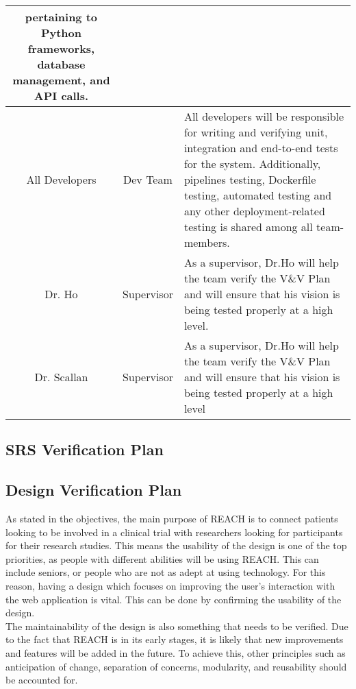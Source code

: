 \documentclass[12pt, titlepage]{article}
\begin{document}
\begin{table}[H]
\begin{tabular}{|c|c|p{10cm}|}
        pertaining to Python frameworks, database management, and API calls. \\
        \hline
        All Developers & Dev Team & All developers will be responsible for writing and verifying unit, integration and 
        end-to-end tests for the system. Additionally, pipelines testing, Dockerfile testing, automated testing and any 
        other deployment-related testing is shared among all team-members.\\
        \hline
        Dr. Ho & Supervisor & As a supervisor, Dr.Ho will help the team verify the V\&V Plan and will ensure that 
        his vision is being tested properly at a high level.\\
        \hline
        Dr. Scallan & Supervisor & As a supervisor, Dr.Ho will help the team verify the V\&V Plan and will 
        ensure that his vision is being tested properly at a high level \\       
        \hline
    \end{tabular}
\end{table}

\subsection{SRS Verification Plan}



\subsection{Design Verification Plan}

As stated in the objectives, the main purpose of REACH is to connect patients looking to be 
involved in a clinical trial with researchers looking for participants for their research studies. 
This means the usability of the design is one of the top priorities, as people with different 
abilities will be using REACH. This can include seniors, or people who are not as adept at using 
technology. For this reason, having a design which focuses on improving the user's interaction 
with the web application is vital. This can be done by confirming the usability of the design.\\

The maintainability of the design is also something that needs to be verified. Due to the fact 
that REACH is in its early stages, it is likely that new improvements and features will be added 
in the future. To achieve this, other principles such as anticipation of change, separation of 
concerns, modularity, and reusability should be accounted for.
\end{document}
